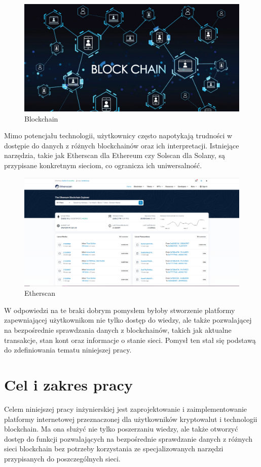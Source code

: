 \begin{figure}[htb]
    \centering
    \includegraphics[width=0.8\linewidth]{./obrazy/blockchain}
    \caption{Blockchain}
    \label{fig:Blockchain}
\end{figure}

Mimo potencjału technologii, użytkownicy często napotykają trudności w dostępie do danych z różnych blockchainów oraz ich interpretacji. Istniejące narzędzia, takie jak Etherscan dla Ethereum czy Solscan dla Solany, są przypisane konkretnym sieciom, co ogranicza ich uniwersalność. 
\begin{figure}[htb]
    \centering
    \includegraphics[width=0.8\linewidth]{./obrazy/Etherscan.png}
    \caption{Etherscan}
    \label{fig:Etherscan}
\end{figure}
W odpowiedzi na te braki dobrym pomysłem byłoby stworzenie platformy zapewniającej użytkownikom nie tylko dostęp do wiedzy, ale także pozwalającej na bezpośrednie sprawdzania danych z blockchainów, takich jak aktualne transakcje, stan kont oraz informacje o stanie sieci. Pomysł ten stał się podstawą do zdefiniowania tematu niniejszej pracy.


\section{Cel i zakres pracy}
Celem niniejszej pracy inżynierskiej jest zaprojektowanie i zaimplementowanie platformy internetowej przeznaczonej dla użytkowników kryptowalut i technologii blockchain. Ma ona służyć nie tylko poszerzaniu wiedzy, ale także otworzyć dostęp do funkcji pozwalających na bezpośrednie sprawdzanie danych z różnych sieci blockchain bez potrzeby korzystania ze specjalizowanych narzędzi przypisanych do poszczególnych sieci.

